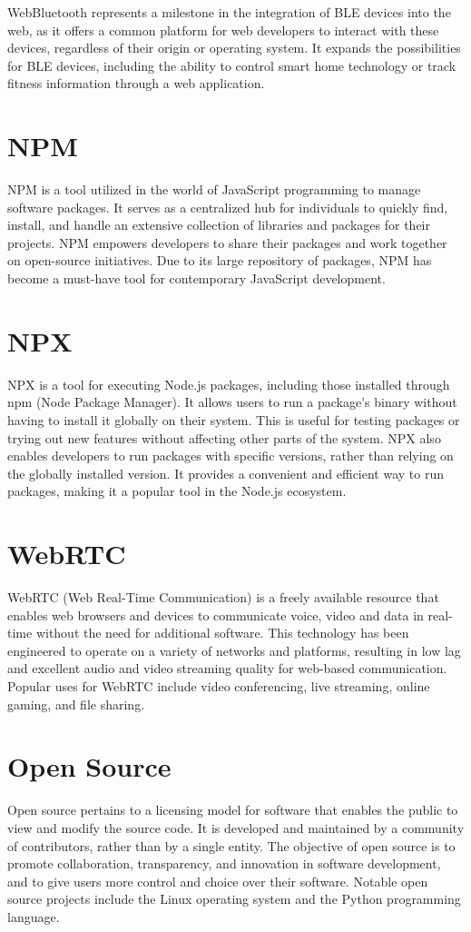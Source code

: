 \documentclass{l4proj}
\begin{document}
WebBluetooth represents a milestone in the integration of BLE devices into the web, as it offers a common platform for web developers to interact with these devices, regardless of their origin or operating system. It expands the possibilities for BLE devices, including the ability to control smart home technology or track fitness information through a web application.

\section{NPM}
\text NPM is a tool utilized in the world of JavaScript programming to manage software packages. It serves as a centralized hub for individuals to quickly find, install, and handle an extensive collection of libraries and packages for their projects. NPM empowers developers to share their packages and work together on open-source initiatives. Due to its large repository of packages, NPM has become a must-have tool for contemporary JavaScript development.

\section{NPX}
\text NPX is a tool for executing Node.js packages, including those installed through npm (Node Package Manager). It allows users to run a package's binary without having to install it globally on their system. This is useful for testing packages or trying out new features without affecting other parts of the system. NPX also enables developers to run packages with specific versions, rather than relying on the globally installed version. It provides a convenient and efficient way to run packages, making it a popular tool in the Node.js ecosystem.

\section{WebRTC}
\text WebRTC (Web Real-Time Communication) is a freely available resource that enables web browsers and devices to communicate voice, video and data in real-time without the need for additional software. This technology has been engineered to operate on a variety of networks and platforms, resulting in low lag and excellent audio and video streaming quality for web-based communication. Popular uses for WebRTC include video conferencing, live streaming, online gaming, and file sharing.

\section{Open Source}
\text Open source pertains to a licensing model for software that enables the public to view and modify the source code. It is developed and maintained by a community of contributors, rather than by a single entity. The objective of open source is to promote collaboration, transparency, and innovation in software development, and to give users more control and choice over their software. Notable open source projects include the Linux operating system and the Python programming language.
\end{document}
